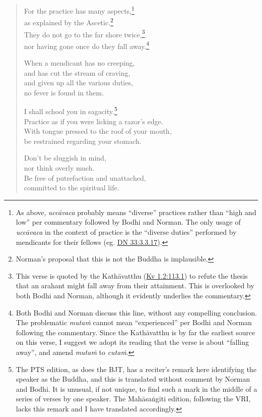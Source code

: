 \documentclass[12pt,openany]{book}%
\begin{document}
\begin{verse}
For the practice has many aspects,\footnote{As above, \textit{\textsanskrit{uccāvaca}} probably means “diverse” practices rather than “high and low” per commentary followed by Bodhi and Norman. The only usage of \textit{\textsanskrit{uccāvaca}} in the context of practice is the “diverse duties” performed by mendicants for their fellows (eg. \href{https://suttacentral.net/dn33/en/sujato\#3.3.17}{DN 33:3.3.17}). } \\
as explained by the Ascetic.\footnote{Norman’s proposal that this is not the Buddha is implausible. } \\
They do not go to the far shore twice,\footnote{This verse is quoted by the \textsanskrit{Kathāvatthu} (\href{https://suttacentral.net/kv1.2/en/sujato\#113.1}{Kv 1.2:113.1}) to refute the thesis that an arahant might fall away from their attainment. This is overlooked by both Bodhi and Norman, although it evidently underlies the commentary. } \\
nor having gone once do they fall away.\footnote{Both Bodhi and Norman discuss this line, without any compelling conclusion. The problematic \textit{\textsanskrit{mutaṁ}} cannot mean “experienced” per Bodhi and Norman following the commentary. Since the \textsanskrit{Kathāvatthu} is by far the earliest source on this verse, I suggest we adopt its reading that the verse is about “falling away”, and amend \textit{\textsanskrit{mutaṁ}} to \textit{\textsanskrit{cutaṁ}}. } 

When a mendicant has no creeping, \\
and has cut the stream of craving, \\
and given up all the various duties, \\
no fever is found in them. 

I shall school you in sagacity.\footnote{The PTS edition, as does the BJT, has a reciter’s remark here identifying the speaker as the Buddha, and this is translated without comment by Norman and Bodhi. It is unusual, if not unique, to find such a mark in the middle of a series of verses by one speaker. The \textsanskrit{Mahāsaṅgīti} edition, following the VRI, lacks this remark and I have translated accordingly. } \\
Practice as if you were licking a razor’s edge. \\
With tongue pressed to the roof of your mouth, \\
be restrained regarding your stomach. 

Don’t be sluggish in mind, \\
nor think overly much. \\
Be free of putrefaction and unattached, \\
committed to the spiritual life. 


\end{verse}
\end{document}
